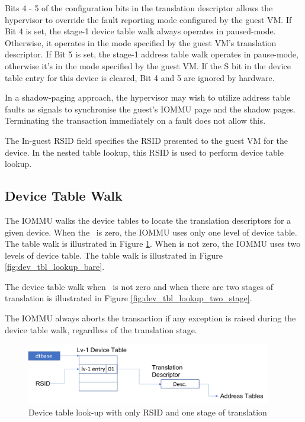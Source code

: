 Bits 4 - 5 of the configuration bits in the translation descriptor allows the hypervisor
to override the fault reporting mode configured by the guest VM. If Bit 4 is set, the
stage-1 device table walk always operates in paused-mode. Otherwise, it operates in the
mode specified by the guest VM's translation descriptor. If Bit 5 is set, the stage-1
address table walk operates in pause-mode, otherwise it's in the mode specified by the
guest VM. If the S bit in the device table entry for this device is cleared, Bit 4 and 5
are ignored by hardware.

\note In a shadow-paging approach, the hypervisor may wish to utilize address table faults
as signals to synchronise the guest's IOMMU page and the shadow pages. Terminating the
transaction immediately on a fault does not allow this. \noteend

The In-guest RSID field specifies the RSID presented to the guest VM for the device. In
the nested table lookup, this RSID is used to perform device table lookup.

\subsection{Device Table Walk}

The IOMMU walks the device tables to locate the translation descriptors for a given
device. When the \rsiddiv\ is zero, the IOMMU uses only one level of device table. The
table walk is illustrated in Figure \ref{fig:dev_tbl_lookup_rsid_short}. When \rsiddiv is
not zero, the IOMMU uses two levels of device table. The table walk is illustrated in
Figure \ref{fig:dev_tbl_lookup_bare}.

The device table walk when \rsiddiv\ is not zero and when there are two stages of
translation is illustrated in Figure \ref{fig:dev_tbl_lookup_two_stage}.

The IOMMU always aborts the transaction if any exception is raised during the device table
walk, regardless of the translation stage.

\begin{figure}[h!t]
    \centering
    \includegraphics[width=0.95\textwidth]{img/dev_tbl_lookup_short_rsid.pdf}
    \caption{Device table look-up with only RSID and one stage of translation}
    \label{fig:dev_tbl_lookup_rsid_short}
\end{figure}

